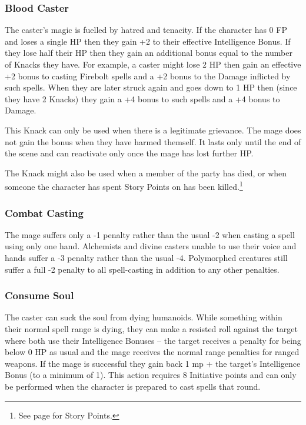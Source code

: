 \documentclass[titlepage,a4paper,openany]{book}
\begin{document}
\begin{multicols}{2}

\subsubsection{Blood Caster}

The caster's magic is fuelled by hatred and tenacity. If the character has 0 FP and loses a single HP then they gain +2 to their effective Intelligence Bonus. If they lose half their HP then they gain an additional bonus equal to the number of Knacks they have. For example, a caster might lose 2 HP then gain an effective +2 bonus to casting Firebolt spells and a +2 bonus to the Damage inflicted by such spells. When they are later struck again and goes down to 1 HP then (since they have 2 Knacks) they gain a +4 bonus to such spells and a +4 bonus to Damage.

This Knack can only be used when there is a legitimate grievance. The mage does not gain the bonus when they have harmed themself. It lasts only until the end of the scene and can reactivate only once the mage has lost further HP.

The Knack might also be used when a member of the party has died, or when someone the character has spent Story Points on has been killed.\footnote{See page \pageref{stories} for Story Points.}

\subsubsection{Combat Casting}

The mage suffers only a -1 penalty rather than the usual -2 when casting a spell using only one hand. Alchemists and divine casters unable to use their voice and hands suffer a -3 penalty rather than the usual -4. Polymorphed creatures still suffer a full -2 penalty to all spell-casting in addition to any other penalties.

\subsubsection{Consume Soul}

The caster can suck the soul from dying humanoids. While something within their normal spell range is dying, they can make a resisted roll against the target where both use their Intelligence Bonuses -- the target receives a penalty for being below 0 HP as usual and the mage receives the normal range penalties for ranged weapons. If the mage is successful they gain back 1 \gls{mp} + the target's Intelligence Bonus (to a minimum of 1).
This action requires 8 Initiative points and can only be performed when the character is prepared to cast spells that \gls{round}.


\end{multicols}
\end{document}
